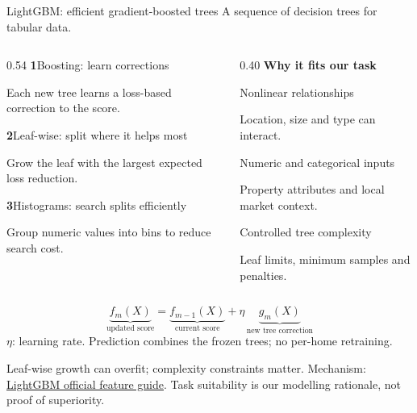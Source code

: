 \documentclass[aspectratio=169,20pt]{beamer}
\newcommand{\smalltext}{\fontsize{15}{19}\selectfont}
\newcommand{\tinytext}{\fontsize{12}{15}\selectfont}
\newcommand{\sourceline}[1]{\par{\tinytext\color{Muted}#1\par}}
\begin{document}
\begin{frame}[t]{LightGBM: efficient gradient-boosted trees}
\relax
{\smalltext\color{Muted}A sequence of decision trees for tabular data.}\par
\vspace{7mm}
\begin{columns}[T,onlytextwidth]
\begin{column}{0.54\textwidth}
{\color{Blue}\bfseries 1}\quad Boosting: learn corrections

{\smalltext Each new tree learns a loss-based correction to the score.\par}
\vspace{6mm}
{\color{Blue}\bfseries 2}\quad Leaf-wise: split where it helps most

{\smalltext Grow the leaf with the largest expected loss reduction.\par}
\vspace{6mm}
{\color{Blue}\bfseries 3}\quad Histograms: search splits efficiently

{\smalltext Group numeric values into bins to reduce search cost.\par}
\end{column}
\begin{column}{0.40\textwidth}
{\color{Teal}\bfseries Why it fits our task}\par
\vspace{4mm}
Nonlinear relationships

{\smalltext Location, size and type can interact.\par}
\vspace{4mm}
Numeric and categorical inputs

{\smalltext Property attributes and local market context.\par}
\vspace{4mm}
Controlled tree complexity

{\smalltext Leaf limits, minimum samples and penalties.\par}
\end{column}
\end{columns}
\vfill
\[
\underbrace{f_m(X)}_{\text{updated score}}
=\underbrace{f_{m-1}(X)}_{\text{current score}}
\mathbin{+}\eta\,\underbrace{g_m(X)}_{\text{new tree correction}}
\]
{\smalltext $\eta$: learning rate. Prediction combines the frozen trees; no per-home retraining.}\par
\sourceline{Leaf-wise growth can overfit; complexity constraints matter. Mechanism: \href{https://lightgbm.readthedocs.io/en/stable/Features.html}{LightGBM official feature guide}. Task suitability is our modelling rationale, not proof of superiority.}
\end{frame}
\end{document}
